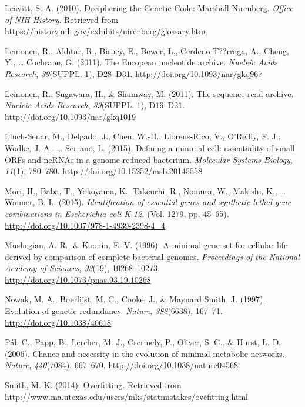 \documentclass[]{report}
\begin{document}
\hypertarget{ref-Leavitt2010}{}
Leavitt, S. A. (2010). Deciphering the Genetic Code: Marshall Nirenberg.
\emph{Office of NIH History}. Retrieved from
\url{https://history.nih.gov/exhibits/nirenberg/glossary.htm}

\hypertarget{ref-Leinonen2011}{}
Leinonen, R., Akhtar, R., Birney, E., Bower, L., Cerdeno-T??rraga, A.,
Cheng, Y., \ldots{} Cochrane, G. (2011). The European nucleotide
archive. \emph{Nucleic Acids Research}, \emph{39}(SUPPL. 1), D28--D31.
\url{http://doi.org/10.1093/nar/gkq967}

\hypertarget{ref-Leinonen2011a}{}
Leinonen, R., Sugawara, H., \& Shumway, M. (2011). The sequence read
archive. \emph{Nucleic Acids Research}, \emph{39}(SUPPL. 1), D19--D21.
\url{http://doi.org/10.1093/nar/gkq1019}

\hypertarget{ref-Lluch-Senar2015}{}
Lluch-Senar, M., Delgado, J., Chen, W.-H., Llorens-Rico, V., O'Reilly,
F. J., Wodke, J. A., \ldots{} Serrano, L. (2015). Defining a minimal
cell: essentiality of small ORFs and ncRNAs in a genome-reduced
bacterium. \emph{Molecular Systems Biology}, \emph{11}(1), 780--780.
\url{http://doi.org/10.15252/msb.20145558}

\hypertarget{ref-Mori2015}{}
Mori, H., Baba, T., Yokoyama, K., Takeuchi, R., Nomura, W., Makishi, K.,
\ldots{} Wanner, B. L. (2015). \emph{Identification of essential genes
and synthetic lethal gene combinations in Escherichia coli K-12.} (Vol.
1279, pp. 45--65). \url{http://doi.org/10.1007/978-1-4939-2398-4_4}

\hypertarget{ref-Mushegian1996}{}
Mushegian, A. R., \& Koonin, E. V. (1996). A minimal gene set for
cellular life derived by comparison of complete bacterial genomes.
\emph{Proceedings of the National Academy of Sciences}, \emph{93}(19),
10268--10273. \url{http://doi.org/10.1073/pnas.93.19.10268}

\hypertarget{ref-Nowak1997}{}
Nowak, M. A., Boerlijst, M. C., Cooke, J., \& Maynard Smith, J. (1997).
Evolution of genetic redundancy. \emph{Nature}, \emph{388}(6638),
167--71. \url{http://doi.org/10.1038/40618}

\hypertarget{ref-Pal2006}{}
Pál, C., Papp, B., Lercher, M. J., Csermely, P., Oliver, S. G., \&
Hurst, L. D. (2006). Chance and necessity in the evolution of minimal
metabolic networks. \emph{Nature}, \emph{440}(7084), 667--670.
\url{http://doi.org/10.1038/nature04568}

\hypertarget{ref-Smith2014}{}
Smith, M. K. (2014). Overfitting. Retrieved from
\url{http://www.ma.utexas.edu/users/mks/statmistakes/ovefitting.html}
\end{document}
